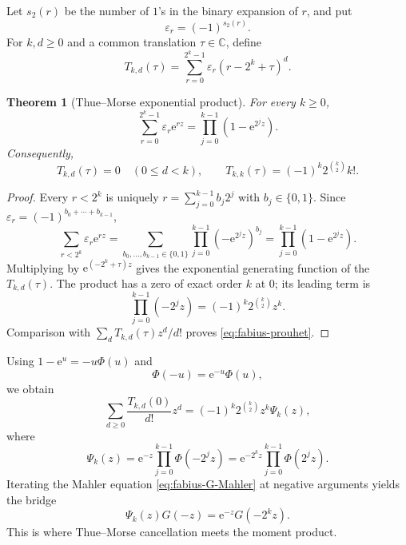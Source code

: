 \documentclass[11pt,oneside,openany]{book}
\newtheorem{theorem}{Theorem}[chapter]
\theoremstyle{definition}
\theoremstyle{remark}
\newcommand{\eps}{\varepsilon}
\newcommand{\C}{\mathbb C}
\newcommand{\e}{\mathrm e}
\begin{document}
Let $s_2(r)$ be the number of $1$'s in the binary expansion of $r$, and put
\begin{equation}\label{eq:fabius-tm-sign}
 \eps_r=(-1)^{s_2(r)}.
\end{equation}
For $k,d\ge0$ and a common translation $\tau\in\C$, define
\begin{equation}\label{eq:fabius-Tkd}
 T_{k,d}(\tau)=\sum_{r=0}^{2^k-1}\eps_r
                (r-2^k+\tau)^d.
\end{equation}

\begin{theorem}[Thue--Morse exponential product]\label{thm:fabius-tm-product}
For every $k\ge0$,
\begin{equation}\label{eq:fabius-tm-product}
 \sum_{r=0}^{2^k-1}\eps_r\e^{rz}
 =\prod_{j=0}^{k-1}(1-\e^{2^jz}).
\end{equation}
Consequently,
\begin{equation}\label{eq:fabius-prouhet}
 T_{k,d}(\tau)=0\quad(0\le d<k),
 \qquad
 T_{k,k}(\tau)=(-1)^k2^{\binom k2}k!.
\end{equation}
\end{theorem}

\begin{proof}
Every $r<2^k$ is uniquely
$r=\sum_{j=0}^{k-1}b_j2^j$ with $b_j\in\{0,1\}$.  Since
$\eps_r=(-1)^{b_0+\cdots+b_{k-1}}$,
\[
 \sum_{r<2^k}\eps_r\e^{rz}
 =\sum_{b_0,\ldots,b_{k-1}\in\{0,1\}}
   \prod_{j=0}^{k-1}(-\e^{2^jz})^{b_j}
 =\prod_{j=0}^{k-1}(1-\e^{2^jz}).
\]
Multiplying by $\e^{(-2^k+\tau)z}$ gives the exponential generating
function of the $T_{k,d}(\tau)$.  The product has a zero of exact order $k$
at $0$; its leading term is
\[
 \prod_{j=0}^{k-1}(-2^jz)
 =(-1)^k2^{\binom k2}z^k.
\]
Comparison with
$\sum_dT_{k,d}(\tau)z^d/d!$ proves \eqref{eq:fabius-prouhet}.
\end{proof}

Using $1-\e^u=-u\Phi(u)$ and
\begin{equation}\label{eq:fabius-Phi-reflection}
 \Phi(-u)=\e^{-u}\Phi(u),
\end{equation}
we obtain
\begin{equation}\label{eq:fabius-normalized-block}
 \sum_{d\ge0}\frac{T_{k,d}(0)}{d!}z^d
 =(-1)^k2^{\binom k2}z^k\Psi_k(z),
\end{equation}
where
\begin{equation}\label{eq:fabius-Psi-k}
 \Psi_k(z)=\e^{-z}\prod_{j=0}^{k-1}\Phi(-2^jz)
           =\e^{-2^kz}\prod_{j=0}^{k-1}\Phi(2^jz).
\end{equation}
Iterating the Mahler equation \eqref{eq:fabius-G-Mahler} at negative
arguments yields the bridge
\begin{equation}\label{eq:fabius-bridge}
 \boxed{\Psi_k(z)G(-z)=\e^{-z}G(-2^kz).}
\end{equation}
This is where Thue--Morse cancellation meets the moment product.
\end{document}
